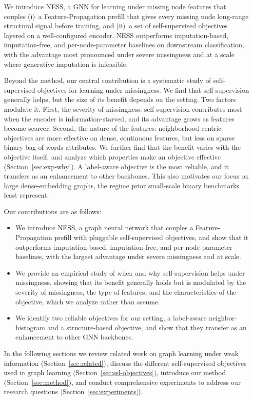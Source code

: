 We introduce NESS, a GNN for learning under missing node features that couples (i)~a Feature-Propagation prefill that gives every missing node long-range structural signal before training, and (ii)~a set of self-supervised objectives layered on a well-configured encoder. NESS outperforms imputation-based, imputation-free, and per-node-parameter baselines on downstream classification, with the advantage most pronounced under severe missingness and at a scale where generative imputation is infeasible.

Beyond the method, our central contribution is a systematic study of self-supervised objectives for learning under missingness. We find that self-supervision generally helps, but the size of its benefit depends on the setting. Two factors modulate it. First, the severity of missingness: self-supervision contributes most when the encoder is information-starved, and its advantage grows as features become scarcer. Second, the nature of the features: neighborhood-centric objectives are more effective on dense, continuous features, but less on sparse binary bag-of-words attributes. We further find that the benefit varies with the objective itself, and analyze which properties make an objective effective (Section~\ref{sec:exp-why}). A label-aware objective is the most reliable, and it transfers as an enhancement to other backbones. This also motivates our focus on large dense-embedding graphs, the regime prior small-scale binary benchmarks least represent.

Our contributions are as follows:
\begin{itemize}
    \item We introduce NESS, a graph neural network that couples a Feature-Propagation prefill with pluggable self-supervised objectives, and show that it outperforms imputation-based, imputation-free, and per-node-parameter baselines, with the largest advantage under severe missingness and at scale.
    \item We provide an empirical study of when and why self-supervision helps under missingness, showing that its benefit generally holds but is modulated by the severity of missingness, the type of features, and the characteristics of the objective, which we analyze rather than assume.
    \item We identify two reliable objectives for our setting, a label-aware neighbor-histogram and a structure-based objective, and show that they transfer as an enhancement to other GNN backbones.
\end{itemize}


In the following sections we review related work on graph learning under weak information (Section~\ref{sec:related}), discuss the different self-supervised objectives used in graph learning (Section~\ref{sec:ssl-objectives}), introduce our method (Section~\ref{sec:method}), and conduct comprehensive experiments to address our research questions (Section~\ref{sec:experiments}).
